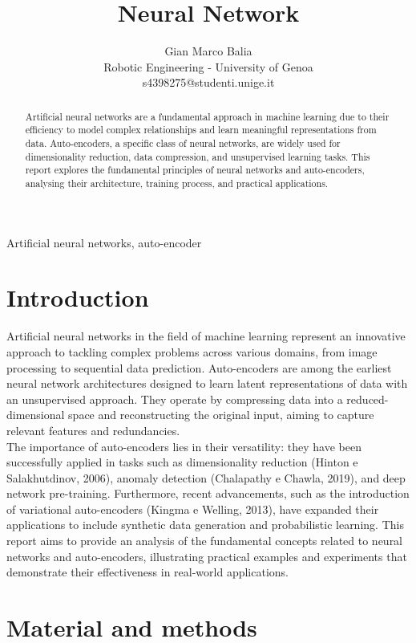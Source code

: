\documentclass[9pt,technote]{IEEEtran}
\title{Neural Network}
\author{
	Gian Marco Balia\\
	Robotic Engineering - University of Genoa\\
	s4398275@studenti.unige.it
}
\begin{document}
\maketitle

\begin{abstract}
Artificial neural networks are a fundamental approach in machine learning due to their efficiency to model complex relationships and learn meaningful representations from data. Auto-encoders, a specific class of neural networks, are widely used for dimensionality reduction, data compression, and unsupervised learning tasks. This report explores the fundamental principles of neural networks and auto-encoders, analysing their architecture, training process, and practical applications.
\end{abstract}
\begin{IEEEkeywords}
Artificial neural networks, auto-encoder
\end{IEEEkeywords}

\section{Introduction}
Artificial neural networks in the field of machine learning represent an innovative approach to tackling complex problems across various domains, from image processing to sequential data prediction. Auto-encoders are among the earliest neural network architectures designed to learn latent representations of data with an unsupervised approach. They operate by compressing data into a reduced-dimensional space and reconstructing the original input, aiming to capture relevant features and redundancies. \\
The importance of auto-encoders lies in their versatility: they have been successfully applied in tasks such as dimensionality reduction (Hinton e Salakhutdinov, 2006), anomaly detection (Chalapathy e Chawla, 2019), and deep network pre-training. Furthermore, recent advancements, such as the introduction of variational auto-encoders (Kingma e Welling, 2013), have expanded their applications to include synthetic data generation and probabilistic learning. This report aims to provide an analysis of the fundamental concepts related to neural networks and auto-encoders, illustrating practical examples and experiments that demonstrate their effectiveness in real-world applications.
\section{Material and methods}
\end{document}
